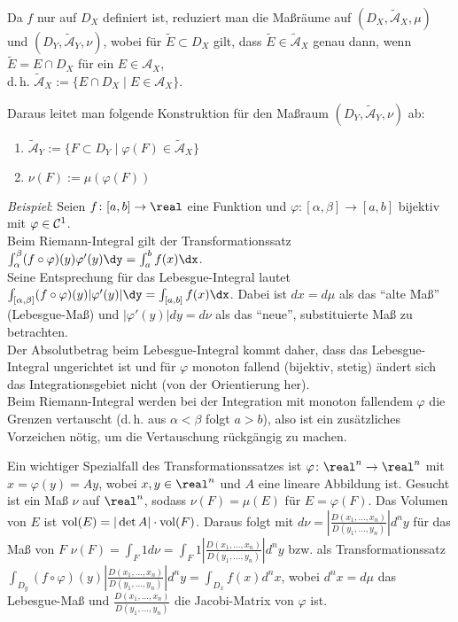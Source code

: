 Da $f$ nur auf $D_X$ definiert ist, reduziert man
die Maßräume auf $(D_X, \widetilde{\mathcal{A}}_X, \mu)$ und
$(D_Y, \widetilde{\mathcal{A}}_Y, \nu)$,
wobei für $\widetilde{E} \subset D_X$ gilt, dass
$\widetilde{E} \in \widetilde{\mathcal{A}}_X$ genau dann, wenn
$\widetilde{E} = E \cap D_X$ für ein $E \in \mathcal{A}_X$, \\
d.\,h. $\widetilde{\mathcal{A}}_X := \{E \cap D_X \;|\; E \in \mathcal{A}_X\}$.

Daraus leitet man folgende Konstruktion für den Maßraum
$(D_Y, \widetilde{\mathcal{A}}_Y, \nu)$ ab:
\begin{enumerate}
    \item
    $\widetilde{\mathcal{A}}_Y :=
    \{F \subset D_Y \;|\; \varphi(F) \in \widetilde{\mathcal{A}}_X\}$

    \item
    $\nu(F) := \mu(\varphi(F))$
\end{enumerate}

\linie

\emph{Beispiel}:
Seien $f\colon [a, b] \rightarrow \real$ eine Funktion und
$\varphi\colon [\alpha, \beta] \rightarrow [a, b]$ bijektiv
mit $\varphi \in \mathcal{C}^1$. \\
Beim Riemann-Integral gilt der Transformationssatz
$\int_\alpha^\beta (f \circ \varphi)(y) \varphi'(y) \dy = \int_a^b f(x)\dx$. \\
Seine Entsprechung für das Lebesgue-Integral lautet
$\int_{[\alpha, \beta]} (f \circ \varphi)(y) |\varphi'(y)| \dy =
\int_{[a, b]} f(x)\dx$.
Dabei ist $dx = d\mu$ als das "`alte Maß"' (Lebesgue-Maß)
und $|\varphi'(y)| dy = d\nu$ als das "`neue"',
substituierte Maß zu betrachten. \\
Der Absolutbetrag beim Lebesgue-Integral kommt daher, dass das
Lebesgue-Integral ungerichtet ist und für $\varphi$ monoton fallend
(bijektiv, stetig) ändert sich das Integrationsgebiet nicht
(von der Orientierung her). \\
Beim Riemann-Integral werden bei der Integration mit monoton fallendem
$\varphi$ die Grenzen vertauscht (d.\,h. aus $\alpha < \beta$ folgt
$a > b$), also ist ein zusätzliches Vorzeichen nötig, um die Vertauschung
rückgängig zu machen.

\linie

\pagebreak

Ein wichtiger Spezialfall des Transformationssatzes
ist $\varphi\colon \real^n \rightarrow \real^n$
mit $x = \varphi(y) = Ay$, wobei $x, y \in \real^n$ und
$A$ eine lineare Abbildung ist.
Gesucht ist ein Maß $\nu$ auf $\real^n$, sodass
$\nu(F) = \mu(E)$ für $E = \varphi(F)$.
Das Volumen von $E$ ist ${\operatorname{vol}}(E) = |\det A| \cdot {\operatorname{vol}}(F)$.
Daraus folgt mit
$d\nu = \left|\frac{D(x_1, \dotsc, x_n)}{D(y_1, \dotsc, y_n)}\right| d^n y$
für das Maß von $F$
$\nu(F) = \int_F 1 d\nu =
\int_F 1 \left|\frac{D(x_1, \dotsc, x_n)}{D(y_1, \dotsc, y_n)}\right| d^n y$
bzw. als Transformationssatz
$\int_{D_y} (f \circ \varphi)(y)
\left|\frac{D(x_1, \dotsc, x_n)}{D(y_1, \dotsc, y_n)}\right| d^n y =
\int_{D_x} f(x) d^n x$, wobei $d^n x = d\mu$ das Lebesgue-Maß
und $\frac{D(x_1, \dotsc, x_n)}{D(y_1, \dotsc, y_n)}$ die Jacobi-Matrix
von $\varphi$ ist.

